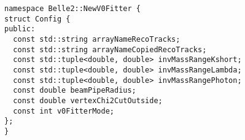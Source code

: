 \begin{verbatim}
namespace Belle2::NewV0Fitter {
struct Config {
public:
  const std::string arrayNameRecoTracks;
  const std::string arrayNameCopiedRecoTracks;
  const std::tuple<double, double> invMassRangeKshort;
  const std::tuple<double, double> invMassRangeLambda;
  const std::tuple<double, double> invMassRangePhoton;
  const double beamPipeRadius;
  const double vertexChi2CutOutside;
  const int v0FitterMode;
};
}
\end{verbatim}